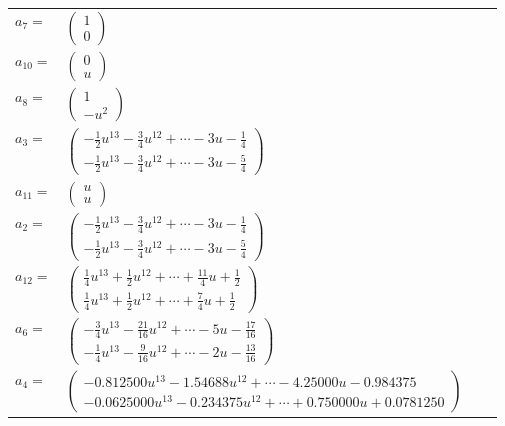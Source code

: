 \documentclass[1p]{elsarticle_modified}
\theoremstyle{definition}
\begin{document}
\begin{tabular}{m{7pt} m{180pt} m{7pt} m{180pt} }
\flushright $a_{7}=$&$\begin{pmatrix}1\\0\end{pmatrix}$ \\
\flushright $a_{10}=$&$\begin{pmatrix}0\\u\end{pmatrix}$ \\
\flushright $a_{8}=$&$\begin{pmatrix}1\\- u^2\end{pmatrix}$ \\
\flushright $a_{3}=$&$\begin{pmatrix}-\frac{1}{2} u^{13}-\frac{3}{4} u^{12}+\cdots-3 u-\frac{1}{4}\\-\frac{1}{2} u^{13}-\frac{3}{4} u^{12}+\cdots-3 u-\frac{5}{4}\end{pmatrix}$ \\
\flushright $a_{11}=$&$\begin{pmatrix}u\\u\end{pmatrix}$ \\
\flushright $a_{2}=$&$\begin{pmatrix}-\frac{1}{2} u^{13}-\frac{3}{4} u^{12}+\cdots-3 u-\frac{1}{4}\\-\frac{1}{2} u^{13}-\frac{3}{4} u^{12}+\cdots-3 u-\frac{5}{4}\end{pmatrix}$ \\
\flushright $a_{12}=$&$\begin{pmatrix}\frac{1}{4} u^{13}+\frac{1}{2} u^{12}+\cdots+\frac{11}{4} u+\frac{1}{2}\\\frac{1}{4} u^{13}+\frac{1}{2} u^{12}+\cdots+\frac{7}{4} u+\frac{1}{2}\end{pmatrix}$ \\
\flushright $a_{6}=$&$\begin{pmatrix}-\frac{3}{4} u^{13}-\frac{21}{16} u^{12}+\cdots-5 u-\frac{17}{16}\\-\frac{1}{4} u^{13}-\frac{9}{16} u^{12}+\cdots-2 u-\frac{13}{16}\end{pmatrix}$ \\
\flushright $a_{4}=$&$\begin{pmatrix}-0.812500 u^{13}-1.54688 u^{12}+\cdots-4.25000 u-0.984375\\-0.0625000 u^{13}-0.234375 u^{12}+\cdots+0.750000 u+0.0781250\end{pmatrix}$ \\

\end{tabular}
\end{document}
